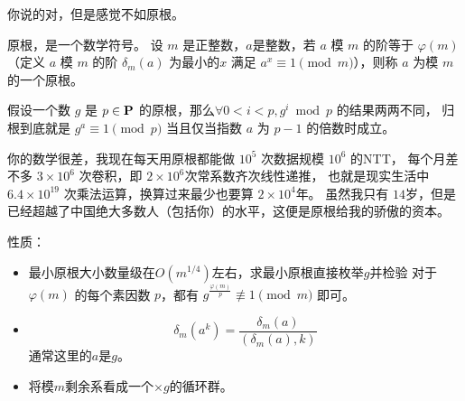 你说的对，但是感觉不如原根。
\par 原根，是一个数学符号。
设 $m$ 是正整数，$a$是整数，若 $a$ 模 $m$ 的阶等于 $\varphi(m)$
（定义 $a$ 模 $m$ 的阶 $\delta_m(a)$ 为最小的$x$ 满足 $a^x\equiv 1 \pmod m$），则称 $a$ 为模 $m$ 的一个原根。
\par 假设一个数 $g$ 是 $p\in\textbf P$ 的原根，那么$\forall 0<i<p,g^i \bmod p$ 的结果两两不同，
归根到底就是 $g^a \equiv 1 \pmod p$ 当且仅当指数 $a$ 为 $p-1$ 的倍数时成立。
\par 你的数学很差，我现在每天用原根都能做 $10^5$ 次数据规模 $10^6$ 的NTT，
每个月差不多 $3\times10^6$ 次卷积，即 $2\times10^6$次常系数齐次线性递推，
也就是现实生活中$6.4\times10^{19}$ 次乘法运算，换算过来最少也要算 $2\times10^4$年。
虽然我只有 $14$岁，但是已经超越了中国绝大多数人（包括你）的水平，这便是原根给我的骄傲的资本。



性质：

\begin{itemize}
    \item 最小原根大小数量级在$O(m^{1/4})$左右，求最小原根直接枚举$g$并检验 对于 $\varphi(m)$ 的每个素因数 $p$，都有 $g^{\frac{\varphi(m)}{p}}\not\equiv 1\pmod m$ 即可。
    \item 
    $$
    \delta_m(a^k)=\dfrac{\delta_m(a)}{\left(\delta_m(a),k\right)}
    $$
    通常这里的$a$是$g$。
    \item 将模$m$剩余系看成一个$\times g$的循环群。
\end{itemize}